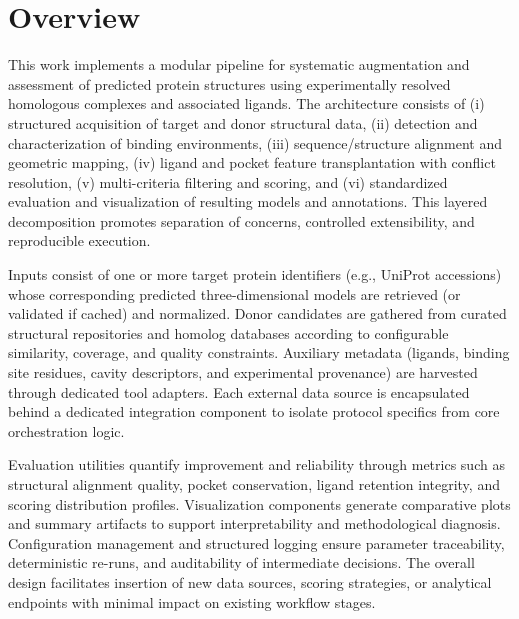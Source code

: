 \label{chap:methods}

\section{Overview}
This work implements a modular pipeline for systematic augmentation and assessment of predicted protein structures using experimentally resolved homologous complexes and associated ligands. The architecture consists of (i) structured acquisition of target and donor structural data, (ii) detection and characterization of binding environments, (iii) sequence/structure alignment and geometric mapping, (iv) ligand and pocket feature transplantation with conflict resolution, (v) multi-criteria filtering and scoring, and (vi) standardized evaluation and visualization of resulting models and annotations. This layered decomposition promotes separation of concerns, controlled extensibility, and reproducible execution.

Inputs consist of one or more target protein identifiers (e.g., UniProt accessions) whose corresponding predicted three-dimensional models are retrieved (or validated if cached) and normalized. Donor candidates are gathered from curated structural repositories and homolog databases according to configurable similarity, coverage, and quality constraints. Auxiliary metadata (ligands, binding site residues, cavity descriptors, and experimental provenance) are harvested through dedicated tool adapters. Each external data source is encapsulated behind a dedicated integration component to isolate protocol specifics from core orchestration logic.

Evaluation utilities quantify improvement and reliability through metrics such as structural alignment quality, pocket conservation, ligand retention integrity, and scoring distribution profiles. Visualization components generate comparative plots and summary artifacts to support interpretability and methodological diagnosis. Configuration management and structured logging ensure parameter traceability, deterministic re-runs, and auditability of intermediate decisions. The overall design facilitates insertion of new data sources, scoring strategies, or analytical endpoints with minimal impact on existing workflow stages.


